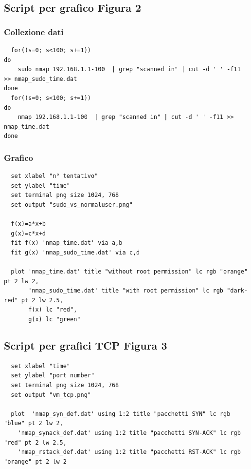 \documentclass{article}
\begin{document}
\subsection{Script per grafico Figura 2}
\subsubsection{Collezione dati}
\begin{verbatim}
  for((s=0; s<100; s+=1))
do
	sudo nmap 192.168.1.1-100  | grep "scanned in" | cut -d ' ' -f11 >> nmap_sudo_time.dat
done
  for((s=0; s<100; s+=1))
do
	nmap 192.168.1.1-100  | grep "scanned in" | cut -d ' ' -f11 >> nmap_time.dat
done

\end{verbatim}
\subsubsection{Grafico}
 \begin{verbatim}
  set xlabel "n° tentativo"
  set ylabel "time"
  set terminal png size 1024, 768
  set output "sudo_vs_normaluser.png"
  
  f(x)=a*x+b
  g(x)=c*x+d
  fit f(x) 'nmap_time.dat' via a,b
  fit g(x) 'nmap_sudo_time.dat' via c,d

  plot 'nmap_time.dat' title "without root permission" lc rgb "orange" pt 2 lw 2,
       'nmap_sudo_time.dat' title "with root permission" lc rgb "dark-red" pt 2 lw 2.5,
       f(x) lc "red",
       g(x) lc "green"
 \end{verbatim}
\subsection{Script per grafici TCP Figura 3}
\begin{verbatim}
  set xlabel "time"
  set ylabel "port number"
  set terminal png size 1024, 768
  set output "vm_tcp.png"
  
  plot  'nmap_syn_def.dat' using 1:2 title "pacchetti SYN" lc rgb "blue" pt 2 lw 2,
    'nmap_synack_def.dat' using 1:2 title "pacchetti SYN-ACK" lc rgb "red" pt 2 lw 2.5,
    'nmap_rstack_def.dat' using 1:2 title "pacchetti RST-ACK" lc rgb "orange" pt 2 lw 2 
\end{verbatim}
\end{document}
